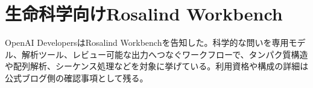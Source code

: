 \section{生命科学向けRosalind Workbench}
OpenAI DevelopersはRosalind Workbenchを告知した。科学的な問いを専用モデル、解析ツール、レビュー可能な出力へつなぐワークフローで、タンパク質構造や配列解析、シーケンス処理などを対象に挙げている。利用資格や構成の詳細は公式ブログ側の確認事項として残る。
